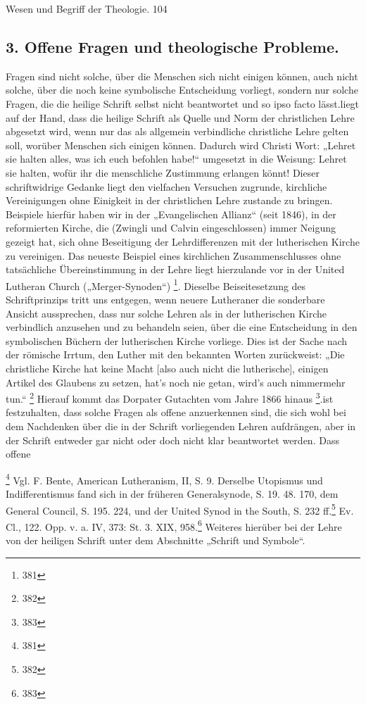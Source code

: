 Wesen und Begriff der Theologie. \hfill 104\n\n\subsection*{3. Offene Fragen und theologische Probleme.}\n\nOffene Fragen sind nicht solche, über die Menschen sich nicht einigen können, auch nicht solche, über die noch keine symbolische Entscheidung vorliegt, sondern nur solche Fragen, die die heilige Schrift selbst nicht beantwortet und so ipso facto lässt.\n\nEs liegt auf der Hand, dass die heilige Schrift als Quelle und Norm der christlichen Lehre abgesetzt wird, wenn nur das als allgemein verbindliche christliche Lehre gelten soll, worüber Menschen sich einigen können. Dadurch wird Christi Wort: „Lehret sie halten alles, was ich euch befohlen habe!“ umgesetzt in die Weisung: Lehret sie halten, wofür ihr die menschliche Zustimmung erlangen könnt! Dieser schriftwidrige Gedanke liegt den vielfachen Versuchen zugrunde, kirchliche Vereinigungen ohne Einigkeit in der christlichen Lehre zustande zu bringen. Beispiele hierfür haben wir in der „Evangelischen Allianz“ (seit 1846), in der reformierten Kirche, die (Zwingli und Calvin eingeschlossen) immer Neigung gezeigt hat, sich ohne Beseitigung der Lehrdifferenzen mit der lutherischen Kirche zu vereinigen. Das neueste Beispiel eines kirchlichen Zusammenschlusses ohne tatsächliche Übereinstimmung in der Lehre liegt hierzulande vor in der United Lutheran Church („Merger-Synoden“) \footnote{381}. Dieselbe Beiseitesetzung des Schriftprinzips tritt uns entgegen, wenn neuere Lutheraner die sonderbare Ansicht aussprechen, dass nur solche Lehren als in der lutherischen Kirche verbindlich anzusehen und zu behandeln seien, über die eine Entscheidung in den symbolischen Büchern der lutherischen Kirche vorliege. Dies ist der Sache nach der römische Irrtum, den Luther mit den bekannten Worten zurückweist: „Die christliche Kirche hat keine Macht [also auch nicht die lutherische], einigen Artikel des Glaubens zu setzen, hat’s noch nie getan, wird’s auch nimmermehr tun.“ \footnote{382} Hierauf kommt das Dorpater Gutachten vom Jahre 1866 hinaus \footnote{383}.\n\nHinzugegen ist festzuhalten, dass solche Fragen als offene anzuerkennen sind, die sich wohl bei dem Nachdenken über die in der Schrift vorliegenden Lehren aufdrängen, aber in der Schrift entweder gar nicht oder doch nicht klar beantwortet werden. Dass offene\n\n\addtocounter{footnote}{380}\n\footnote{381} Vgl. F. Bente, American Lutheranism, II, S. 9. Derselbe Utopismus und Indifferentismus fand sich in der früheren Generalsynode, S. 19. 48. 170, dem General Council, S. 195. 224, und der United Synod in the South, S. 232 ff.\n\footnote{382} Ev. Cl., 122. Opp. v. a. IV, 373: St. 3. XIX, 958.\n\footnote{383} Weiteres hierüber bei der Lehre von der heiligen Schrift unter dem Abschnitte „Schrift und Symbole“.